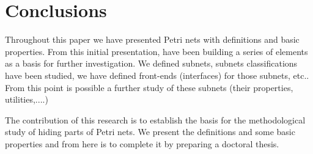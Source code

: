 
\chapter{Conclusions} %

\label{Chapter4} %




Throughout this paper we have presented Petri nets with definitions and basic properties. From this initial presentation, have been building a series of elements as a basis for further investigation. We defined subnets, subnets classifications have been studied, we have defined front-ends (interfaces) for those subnets, etc.. From this point is possible a further study of these subnets (their properties, utilities,....)

The contribution of this research is to establish the basis for the methodological study of hiding parts of Petri nets. We present the definitions and some basic properties and from here is to complete it by preparing a doctoral thesis.
